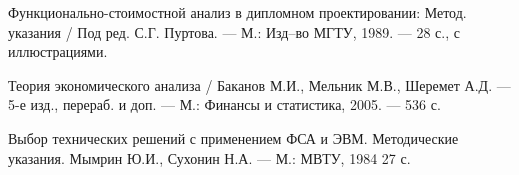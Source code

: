 
 Функционально-стоимостной анализ в дипломном проектировании:
                    Метод. указания / Под ред. С.Г. Пуртова. ---
                    М.: Изд--во МГТУ, 1989. --- 28 с., с иллюстрациями.

 Теория экономического анализа / Баканов М.И., Мельник М.В.,
                    Шеремет А.Д. --- 5-е изд., перераб. и доп. --- М.:
                    Финансы и статистика, 2005. --- 536 с.

 Выбор технических решений с применением ФСА и ЭВМ.
                      Методические указания. Мымрин Ю.И., Сухонин Н.А. ---
                      М.: МВТУ, 1984 27 с.

\endinput
